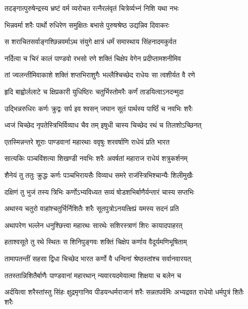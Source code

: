 \twolineshloka
{तदङ्गात्पुरुषेन्द्रस्य भ्रष्टं वर्म व्यरोचत}
{रत्नैरलंवृतं चित्रेर्व्यभ्नं निशि यथा नभः}


\twolineshloka
{भिन्नवर्मा शरैः पार्थो रुधिरेण समुक्षितः}
{बभासे पुरुषश्रेष्ठ उद्यन्निव दिवाकरः}


\twolineshloka
{स शराचितसर्वाङ्गश्छिन्नवर्माऽथ संयुगे}
{क्षात्रं धर्मं समास्थाय सिंहनादमकुर्वत}


\twolineshloka
{नर्दित्वा च चिरं कालं पाण्डवो रभसो रणे}
{शक्तिं चिक्षेप वेगेन प्रदीप्तामशनीमिव}


\twolineshloka
{तां ज्वलन्तीमिवाकाशे शक्तिं शप्तभिराशुगैः}
{भल्लैश्चिच्छेद राधेयः सा त्वशीर्यत वै रणे}


\twolineshloka
{हृदि बाह्वोर्ललाटे च क्षिप्रकारी युधिष्ठिरः}
{चतुर्भिस्तोमरैः कर्णं ताडयित्वाऽनदन्मुदा}


\twolineshloka
{उद्भिन्नरुधिरः कर्णः क्रुद्वः सर्प इव श्वसन्}
{जघान सूतं पार्थस्य पार्ष्ठिं च नवभिः शरैः}


\twolineshloka
{ध्वजं चिच्छेद नृपतेस्त्रिभिर्विव्याध चैव तम्}
{इषुधी चास्य चिच्छेद रथं च तिलशोऽच्छिनत्}


\twolineshloka
{एतस्मिन्नन्तरे शूराः पाण्डवानां महारथाः}
{ववृषुः शरवर्षाणि राधेयं प्रति भारत}


\twolineshloka
{सात्यकिः पञ्चविंशत्या शिखण्डी नवभिः शरैः}
{अवर्षतां महाराज राधेयं शत्रुकर्शनम्}


\twolineshloka
{शैनेयं तु ततुः क्रुद्धः कर्णः पञ्चभिरायसैः}
{विव्याध समरे राजंस्त्रिभिश्चान्यैः शिलीमुखैः}


\twolineshloka
{दक्षिणं तु भुजं तस्य त्रिभिः कर्णोऽभ्यविध्यत}
{सव्यं षोडशभिर्बाणैर्यन्तारं चास्य सप्तभिः}


\twolineshloka
{अथास्य चतुरो वाहांश्चतुर्भिर्निशितैः शरैः}
{सूतपुत्रोऽनयत्क्षिप्रं यमस्य सदनं प्रति}


\twolineshloka
{अथापरेण भल्लेन धनुश्छित्त्वा महारथः}
{सारथेः सशिरस्त्राणं शिरः कायादपाहरत्}


\twolineshloka
{हताश्वसूते तु रथे स्थितः स शिनिपुङ्गवः}
{शक्तिं चिक्षेप कर्णाय वैदूर्यमणिभूषिताम्}


\twolineshloka
{तामापतन्तीं सहसा द्विधा चिच्छेद भारत}
{कर्णो वै धन्विनां श्रेष्ठस्तांश्च सर्वानवारयत्}


\twolineshloka
{ततस्तान्निशितैर्बाणैः पाण्डवानां महारथान्}
{न्यवारयदमेयात्मा शिक्षया च बलेन च}


\threelineshloka
{अर्दयित्वा शरैस्तांस्तु सिंहः क्षुद्रमृगानिव}
{पीडयन्धर्मराजानं शरैः सन्नतपर्वमिः}
{अभ्यद्रवत राधेयो धर्मपुत्रं शितैः शरैः}


